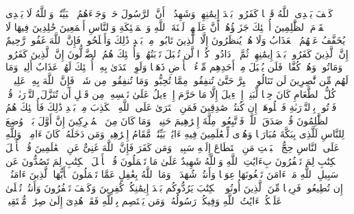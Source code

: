 \stopbuffer
\startbuffer[\q:3:86]
كَیۡفَ یَهۡدِی ٱللَّهُ قَوۡمࣰا كَفَرُوا۟ بَعۡدَ إِیمَٰنِهِمۡ وَشَهِدُوۤا۟ أَنَّ ٱلرَّسُولَ حَقࣱّ وَجَاۤءَهُمُ ٱلۡبَیِّنَٰتُۚ وَٱللَّهُ لَا یَهۡدِی ٱلۡقَوۡمَ ٱلظَّٰلِمِینَ%
\stopbuffer
\startbuffer[\q:3:87]
أُو۟لَٰۤئِكَ جَزَاۤؤُهُمۡ أَنَّ عَلَیۡهِمۡ لَعۡنَةَ ٱللَّهِ وَٱلۡمَلَٰۤئِكَةِ وَٱلنَّاسِ أَجۡمَعِینَ%
\stopbuffer
\startbuffer[\q:3:88]
خَٰلِدِینَ فِیهَا لَا یُخَفَّفُ عَنۡهُمُ ٱلۡعَذَابُ وَلَا هُمۡ یُنظَرُونَ%
\stopbuffer
\startbuffer[\q:3:89]
إِلَّا ٱلَّذِینَ تَابُوا۟ مِنۢ بَعۡدِ ذَٰلِكَ وَأَصۡلَحُوا۟ فَإِنَّ ٱللَّهَ غَفُورࣱ رَّحِیمٌ%
\stopbuffer
\startbuffer[\q:3:90]
إِنَّ ٱلَّذِینَ كَفَرُوا۟ بَعۡدَ إِیمَٰنِهِمۡ ثُمَّ ٱزۡدَادُوا۟ كُفۡرࣰا لَّن تُقۡبَلَ تَوۡبَتُهُمۡ وَأُو۟لَٰۤئِكَ هُمُ ٱلضَّاۤلُّونَ%
\stopbuffer
\startbuffer[\q:3:91]
إِنَّ ٱلَّذِینَ كَفَرُوا۟ وَمَاتُوا۟ وَهُمۡ كُفَّارࣱ فَلَن یُقۡبَلَ مِنۡ أَحَدِهِم مِّلۡءُ ٱلۡأَرۡضِ ذَهَبࣰا وَلَوِ ٱفۡتَدَىٰ بِهِۦۤۗ أُو۟لَٰۤئِكَ لَهُمۡ عَذَابٌ أَلِیمࣱ وَمَا لَهُم مِّن نَّٰصِرِینَ%
\stopbuffer
\startbuffer[\q:3:92]
لَن تَنَالُوا۟ ٱلۡبِرَّ حَتَّىٰ تُنفِقُوا۟ مِمَّا تُحِبُّونَۚ وَمَا تُنفِقُوا۟ مِن شَیۡءࣲ فَإِنَّ ٱللَّهَ بِهِۦ عَلِیمࣱ%
\stopbuffer
\startbuffer[\q:3:93]
۞ كُلُّ ٱلطَّعَامِ كَانَ حِلࣰّا لِّبَنِیۤ إِسۡرَٰۤءِیلَ إِلَّا مَا حَرَّمَ إِسۡرَٰۤءِیلُ عَلَىٰ نَفۡسِهِۦ مِن قَبۡلِ أَن تُنَزَّلَ ٱلتَّوۡرَىٰةُۚ قُلۡ فَأۡتُوا۟ بِٱلتَّوۡرَىٰةِ فَٱتۡلُوهَاۤ إِن كُنتُمۡ صَٰدِقِینَ%
\stopbuffer
\startbuffer[\q:3:94]
فَمَنِ ٱفۡتَرَىٰ عَلَى ٱللَّهِ ٱلۡكَذِبَ مِنۢ بَعۡدِ ذَٰلِكَ فَأُو۟لَٰۤئِكَ هُمُ ٱلظَّٰلِمُونَ%
\stopbuffer
\startbuffer[\q:3:95]
قُلۡ صَدَقَ ٱللَّهُۗ فَٱتَّبِعُوا۟ مِلَّةَ إِبۡرَٰهِیمَ حَنِیفࣰاۖ وَمَا كَانَ مِنَ ٱلۡمُشۡرِكِینَ%
\stopbuffer
\startbuffer[\q:3:96]
إِنَّ أَوَّلَ بَیۡتࣲ وُضِعَ لِلنَّاسِ لَلَّذِی بِبَكَّةَ مُبَارَكࣰا وَهُدࣰى لِّلۡعَٰلَمِینَ%
\stopbuffer
\startbuffer[\q:3:97]
فِیهِ ءَایَٰتُۢ بَیِّنَٰتࣱ مَّقَامُ إِبۡرَٰهِیمَۖ وَمَن دَخَلَهُۥ كَانَ ءَامِنࣰاۗ وَلِلَّهِ عَلَى ٱلنَّاسِ حِجُّ ٱلۡبَیۡتِ مَنِ ٱسۡتَطَاعَ إِلَیۡهِ سَبِیلࣰاۚ وَمَن كَفَرَ فَإِنَّ ٱللَّهَ غَنِیٌّ عَنِ ٱلۡعَٰلَمِینَ%
\stopbuffer
\startbuffer[\q:3:98]
قُلۡ یَٰۤأَهۡلَ ٱلۡكِتَٰبِ لِمَ تَكۡفُرُونَ بِءَایَٰتِ ٱللَّهِ وَٱللَّهُ شَهِیدٌ عَلَىٰ مَا تَعۡمَلُونَ%
\stopbuffer
\startbuffer[\q:3:99]
قُلۡ یَٰۤأَهۡلَ ٱلۡكِتَٰبِ لِمَ تَصُدُّونَ عَن سَبِیلِ ٱللَّهِ مَنۡ ءَامَنَ تَبۡغُونَهَا عِوَجࣰا وَأَنتُمۡ شُهَدَاۤءُۗ وَمَا ٱللَّهُ بِغَٰفِلٍ عَمَّا تَعۡمَلُونَ%
\stopbuffer
\startbuffer[\q:3:100]
یَٰۤأَیُّهَا ٱلَّذِینَ ءَامَنُوۤا۟ إِن تُطِیعُوا۟ فَرِیقࣰا مِّنَ ٱلَّذِینَ أُوتُوا۟ ٱلۡكِتَٰبَ یَرُدُّوكُم بَعۡدَ إِیمَٰنِكُمۡ كَٰفِرِینَ%
\stopbuffer
\startbuffer[\q:3:101]
وَكَیۡفَ تَكۡفُرُونَ وَأَنتُمۡ تُتۡلَىٰ عَلَیۡكُمۡ ءَایَٰتُ ٱللَّهِ وَفِیكُمۡ رَسُولُهُۥۗ وَمَن یَعۡتَصِم بِٱللَّهِ فَقَدۡ هُدِیَ إِلَىٰ صِرَٰطࣲ مُّسۡتَقِیمࣲ%
